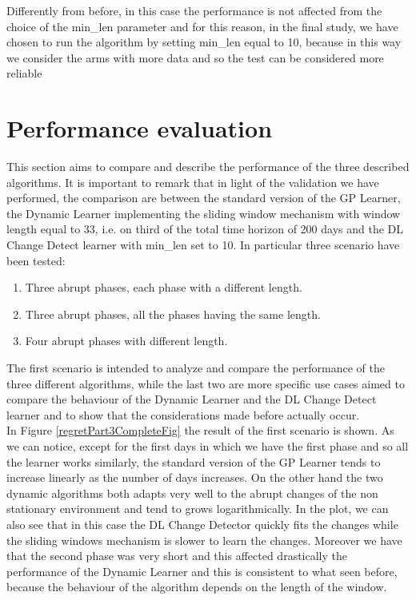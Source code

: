 Differently from before, in this case the performance is not affected from the choice of the min\_len parameter and for this reason, in the final study, we have chosen to run the algorithm by setting min\_len equal to 10, because in this way we consider the arms with more data and so the test can be considered more reliable


\section{Performance evaluation}

This section aims to compare and describe the performance of the three described algorithms.
It is important to remark that in light of the validation we have performed, the comparison are between the standard version of the GP Learner, the Dynamic Learner implementing the sliding window mechanism with window length equal to 33, i.e. on third of the total time horizon of 200 days and the DL Change Detect learner with min\_len set to 10.
In particular three scenario have been tested:

\begin{enumerate}
    \item Three abrupt phases, each phase with a different length.
    \item Three abrupt phases, all the phases having the same length.
    \item Four abrupt phases with different length.
\end{enumerate}

The first scenario is intended to analyze and compare the performance of the three different algorithms, while the last two are more specific use cases aimed to compare the behaviour of the Dynamic Learner and the DL Change Detect learner and to show that the considerations made before actually occur.\\
In Figure \ref{regretPart3CompleteFig} the result of the first scenario is shown. As we can notice, except for the first days in which we have the first phase and so all the learner works similarly, the standard version of the GP Learner tends to increase linearly as the number of days increases. On the other hand the two dynamic algorithms both adapts very well to the abrupt changes of the non stationary environment and tend to grows logarithmically. In the plot, we can also see that in this case the DL Change Detector quickly fits the changes while the sliding windows mechanism is slower to learn the changes. Moreover we have that the second phase was very short and this affected drastically the performance of the Dynamic Learner and this is consistent to what seen before, because the behaviour of the algorithm depends on the length of the window.

